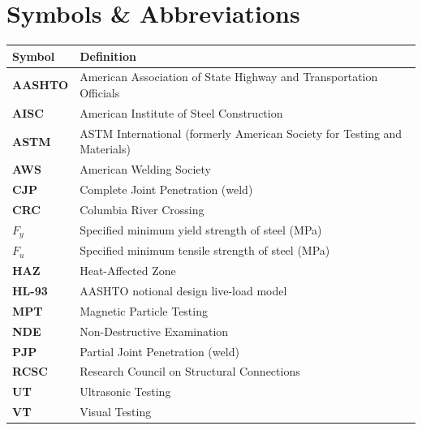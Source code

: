 \section{Symbols \& Abbreviations}

\noindent
{}
\begin{tabularx}{\linewidth}{@{}>{\bfseries\color{accent}}l@{\hspace{8mm}}>{\raggedright\arraybackslash}X@{}}
\toprule
\rowcolor{accent}\color{white}\bfseries Symbol & \color{white}\bfseries Definition \\
\midrule
AASHTO & American Association of State Highway and Transportation Officials \\
AISC   & American Institute of Steel Construction \\
ASTM   & ASTM International (formerly American Society for Testing and Materials) \\
AWS    & American Welding Society \\
CJP    & Complete Joint Penetration (weld) \\
CRC    & Columbia River Crossing \\
$F_y$  & Specified minimum yield strength of steel (MPa) \\
$F_u$  & Specified minimum tensile strength of steel (MPa) \\
HAZ    & Heat-Affected Zone \\
HL-93  & AASHTO notional design live-load model \\
MPT    & Magnetic Particle Testing \\
NDE    & Non-Destructive Examination \\
PJP    & Partial Joint Penetration (weld) \\
RCSC   & Research Council on Structural Connections \\
UT     & Ultrasonic Testing \\
VT     & Visual Testing \\
\bottomrule
\end{tabularx}

